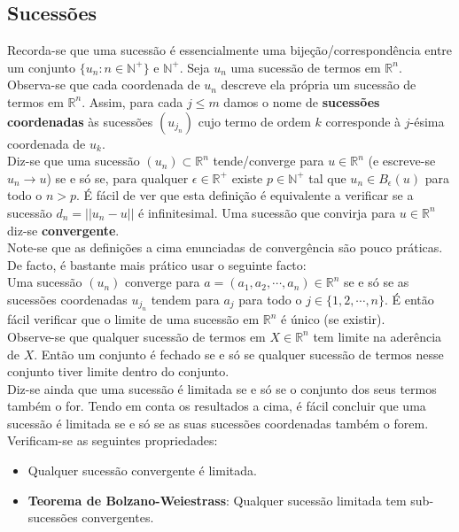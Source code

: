 \documentclass{article}
\newcommand{\R}{\mathbb{R}}
\begin{document}
\subsection{Sucessões}
Recorda-se que uma sucessão é essencialmente uma bijeção/correspondência entre um conjunto $\{ u_n: n \in \mathbb{N}^+\}$ e $\mathbb{N}^+$.
Seja $u_n$ uma sucessão de termos em $\R^n$. Observa-se que cada coordenada de $u_n$ descreve ela própria um sucessão de termos em $\R^n$. Assim, para cada $j \leq m$ damos o nome de \textbf{sucessões coordenadas} às sucessões $(u_{j_n})$ cujo termo de ordem $k$ corresponde à $j$-ésima coordenada de $u_k$.\\
Diz-se que uma sucessão $(u_n) \subset \R^n$ tende/converge para $u \in \R^n$ (e escreve-se $u_n \to u$) se e só se, para qualquer $\epsilon \in \R^+$ existe $p \in \mathbb{N}^+$ tal que $u_n \in B_\epsilon(u)$ para todo o $n>p$. É fácil de ver que esta definição é equivalente a verificar se a sucessão $d_n = || u_n - u ||$ é infinitesimal. Uma sucessão que convirja para $u \in \R^n$ diz-se \textbf{convergente}.\\
Note-se que as definições a cima enunciadas de convergência são pouco práticas. De facto, é bastante mais prático usar o seguinte facto:\\
Uma sucessão $(u_n)$ converge para $a = (a_1, a_2, \cdots , a_n) \in \R^n$ se e só se as sucessões coordenadas $u_{j_n}$ tendem para $a_j$ para todo o $j \in \{ 1,2, \cdots , n \}$. É então fácil verificar que o limite de uma sucessão em $\R^n$ é único (se existir).\\
Observe-se que qualquer sucessão de termos em $X \in \R^n$ tem limite na aderência de $X$. Então um conjunto é fechado se e só se qualquer sucessão de termos nesse conjunto tiver limite dentro do conjunto.\\
Diz-se ainda que uma sucessão é limitada se e só se o conjunto dos seus termos também o for. Tendo em conta os resultados a cima, é fácil concluir que uma sucessão é limitada se e só se as suas sucessões coordenadas também o forem. Verificam-se as seguintes propriedades:
\begin{itemize}
	\item Qualquer sucessão convergente é limitada.
	\item \textbf{Teorema de Bolzano-Weiestrass}: Qualquer sucessão limitada tem sub-sucessões convergentes.
\end{itemize}
\end{document}
